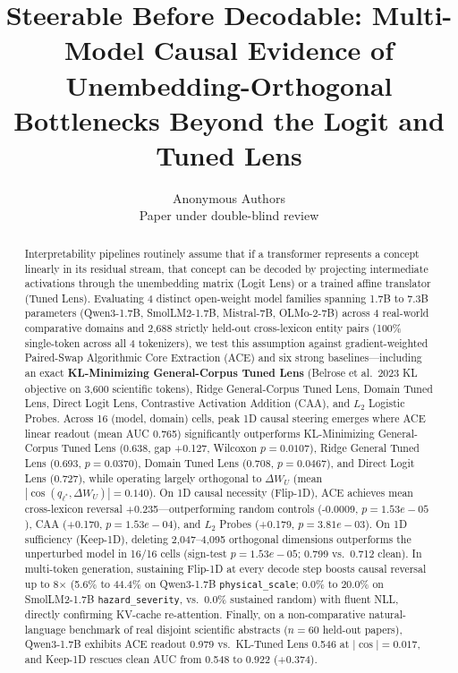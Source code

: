 \documentclass[10pt]{article}
\title{Steerable Before Decodable: Multi-Model Causal Evidence of Unembedding-Orthogonal Bottlenecks Beyond the Logit and Tuned Lens}
\author{\name Anonymous Authors \\
\addr Paper under double-blind review}
\begin{document}
\maketitle
\begin{abstract}
Interpretability pipelines routinely assume that if a transformer represents a concept linearly in its residual stream, that concept can be decoded by projecting intermediate activations through the unembedding matrix (Logit Lens) or a trained affine translator (Tuned Lens). Evaluating 4 distinct open-weight model families spanning 1.7B to 7.3B parameters (Qwen3-1.7B, SmolLM2-1.7B, Mistral-7B, OLMo-2-7B) across 4 real-world comparative domains and 2,688 strictly held-out cross-lexicon entity pairs (100\% single-token across all 4 tokenizers), we test this assumption against gradient-weighted Paired-Swap Algorithmic Core Extraction (ACE) and six strong baselines---including an exact \textbf{KL-Minimizing General-Corpus Tuned Lens} (Belrose et al.\ 2023 KL objective on 3,600 scientific tokens), Ridge General-Corpus Tuned Lens, Domain Tuned Lens, Direct Logit Lens, Contrastive Activation Addition (CAA), and $L_2$ Logistic Probes. Across 16 (model, domain) cells, peak 1D causal steering emerges where ACE linear readout (mean AUC 0.765) significantly outperforms KL-Minimizing General-Corpus Tuned Lens (0.638, gap +0.127, Wilcoxon $p=0.0107$), Ridge General Tuned Lens (0.693, $p=0.0370$), Domain Tuned Lens (0.708, $p=0.0467$), and Direct Logit Lens (0.727), while operating largely orthogonal to $\Delta W_U$ (mean $|\cos(q_{\ell^*}, \Delta W_U)| = 0.140$). On 1D causal necessity (Flip-1D), ACE achieves mean cross-lexicon reversal +0.235---outperforming random controls (-0.0009, $p=1.53e-05$), CAA (+0.170, $p=1.53e-04$), and $L_2$ Probes (+0.179, $p=3.81e-03$). On 1D sufficiency (Keep-1D), deleting 2,047--4,095 orthogonal dimensions outperforms the unperturbed model in 16/16 cells (sign-test $p=1.53e-05$; 0.799 vs.\ 0.712 clean). In multi-token generation, sustaining Flip-1D at every decode step boosts causal reversal up to 8$\times$ (5.6\% to 44.4\% on Qwen3-1.7B \texttt{physical\_scale}; 0.0\% to 20.0\% on SmolLM2-1.7B \texttt{hazard\_severity}, vs.\ 0.0\% sustained random) with fluent NLL, directly confirming KV-cache re-attention. Finally, on a non-comparative natural-language benchmark of real disjoint scientific abstracts ($n=60$ held-out papers), Qwen3-1.7B exhibits ACE readout 0.979 vs.\ KL-Tuned Lens 0.546 at $|\cos|=0.017$, and Keep-1D rescues clean AUC from 0.548 to 0.922 (+0.374).
\end{abstract}
\end{document}
